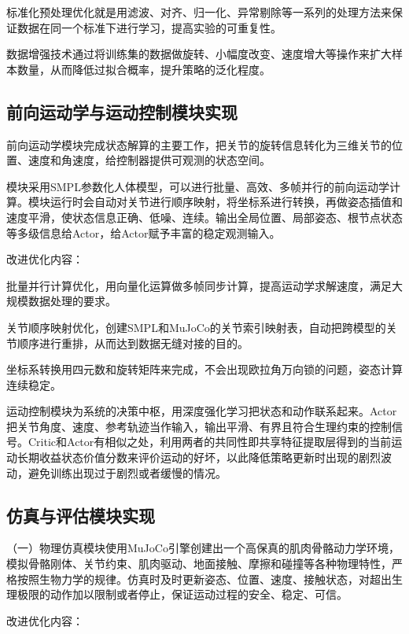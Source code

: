 标准化预处理优化就是用滤波、对齐、归一化、异常剔除等一系列的处理方法来保证数据在同一个标准下进行学习，提高实验的可重复性。

数据增强技术通过将训练集的数据做旋转、小幅度改变、速度增大等操作来扩大样本数量，从而降低过拟合概率，提升策略的泛化程度。

\subsection{前向运动学与运动控制模块实现}\label{ux524dux5411ux8fd0ux52a8ux5b66ux4e0eux8fd0ux52a8ux63a7ux5236ux6a21ux5757ux5b9eux73b0}

前向运动学模块完成状态解算的主要工作，把关节的旋转信息转化为三维关节的位置、速度和角速度，给控制器提供可观测的状态空间。

模块采用SMPL参数化人体模型，可以进行批量、高效、多帧并行的前向运动学计算。模块运行时会自动对关节进行顺序映射，将坐标系进行转换，再做姿态插值和速度平滑，使状态信息正确、低噪、连续。输出全局位置、局部姿态、根节点状态等多级信息给Actor，给Actor赋予丰富的稳定观测输入。

改进优化内容：

批量并行计算优化，用向量化运算做多帧同步计算，提高运动学求解速度，满足大规模数据处理的要求。

关节顺序映射优化，创建SMPL和MuJoCo的关节索引映射表，自动把跨模型的关节顺序进行重排，从而达到数据无缝对接的目的。

坐标系转换用四元数和旋转矩阵来完成，不会出现欧拉角万向锁的问题，姿态计算连续稳定。

运动控制模块为系统的决策中枢，用深度强化学习把状态和动作联系起来。Actor把关节角度、速度、参考轨迹当作输入，输出平滑、有界且符合生理约束的控制信号。Critic和Actor有相似之处，利用两者的共同性即共享特征提取层得到的当前运动长期收益状态价值分数来评价运动的好坏，以此降低策略更新时出现的剧烈波动，避免训练出现过于剧烈或者缓慢的情况。

\subsection{仿真与评估模块实现}\label{ux4effux771fux4e0eux8bc4ux4f30ux6a21ux5757ux5b9eux73b0}

（一）物理仿真模块使用MuJoCo引擎创建出一个高保真的肌肉骨骼动力学环境，模拟骨骼刚体、关节约束、肌肉驱动、地面接触、摩擦和碰撞等各种物理特性，严格按照生物力学的规律。仿真时及时更新姿态、位置、速度、接触状态，对超出生理极限的动作加以限制或者停止，保证运动过程的安全、稳定、可信。

改进优化内容：

